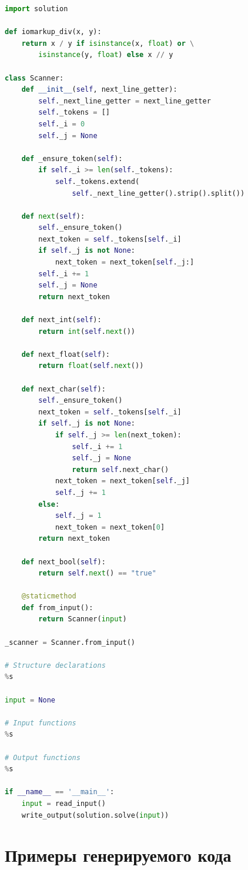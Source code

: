 \documentclass[times,specification,annotation]{style/itmo-student-thesis/itmo-student-thesis}
\begin{document}
\begin{lstlisting}[caption={Шаблон исходного кода грейдера на языке Python},label={templates-grader-python},language=Python]
import solution

def iomarkup_div(x, y):
    return x / y if isinstance(x, float) or \
        isinstance(y, float) else x // y

class Scanner:
    def __init__(self, next_line_getter):
        self._next_line_getter = next_line_getter
        self._tokens = []
        self._i = 0
        self._j = None

    def _ensure_token(self):
        if self._i >= len(self._tokens):
            self._tokens.extend(
                self._next_line_getter().strip().split())

    def next(self):
        self._ensure_token()
        next_token = self._tokens[self._i]
        if self._j is not None:
            next_token = next_token[self._j:]
        self._i += 1
        self._j = None
        return next_token

    def next_int(self):
        return int(self.next())

    def next_float(self):
        return float(self.next())

    def next_char(self):
        self._ensure_token()
        next_token = self._tokens[self._i]
        if self._j is not None:
            if self._j >= len(next_token):
                self._i += 1
                self._j = None
                return self.next_char()
            next_token = next_token[self._j]
            self._j += 1
        else:
            self._j = 1
            next_token = next_token[0]
        return next_token

    def next_bool(self):
        return self.next() == "true"

    @staticmethod
    def from_input():
        return Scanner(input)

_scanner = Scanner.from_input()

# Structure declarations
%s

input = None

# Input functions
%s

# Output functions
%s

if __name__ == '__main__':
    input = read_input()
    write_output(solution.solve(input))
\end{lstlisting}

\chapter{Примеры генерируемого кода}\label{samples-gen-app}
\end{document}
